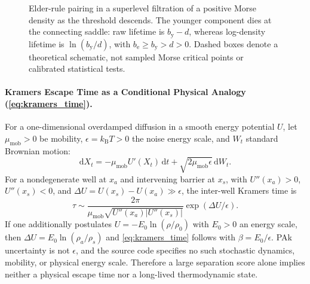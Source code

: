 \begin{figure}[htbp]
  \centering
  \caption{Elder-rule pairing in a superlevel filtration of a positive
    Morse density as the threshold descends. The younger component dies
    at the connecting saddle: raw lifetime is $b_{\mathrm y}-d$, whereas
    log-density lifetime is $\ln(b_{\mathrm y}/d)$, with $b_{\mathrm e}
    \ge b_{\mathrm y}>d>0$. Dashed boxes denote a theoretical schematic,
  not sampled Morse critical points or calibrated statistical tests.}
  \label{fig:supp_persistence_pairing}
\end{figure}

\paragraph{Kramers Escape Time as a Conditional Physical Analogy
(\cref{eq:kramers_time}).}
For a one-dimensional overdamped diffusion in a smooth energy potential
$U$, let $\mu_{\mathrm{mob}}>0$ be mobility, $\epsilon=k_{\mathrm B}T>0$
the noise energy scale, and $W_t$ standard Brownian motion:
\begin{equation}
  \mathrm{d}X_t=-\mu_{\mathrm{mob}}U'(X_t)\,\mathrm{d}t
  +\sqrt{2\mu_{\mathrm{mob}}\epsilon}\,\mathrm{d}W_t.
\end{equation}
For a nondegenerate well at $x_a$ and intervening barrier at $x_s$,
with $U''(x_a)>0$, $U''(x_s)<0$, and
$\Delta U=U(x_s)-U(x_a)\gg\epsilon$, the inter-well Kramers time is
\begin{equation}
  \tau\sim\frac{2\pi}{\mu_{\mathrm{mob}}
  \sqrt{U''(x_a)|U''(x_s)|}}\exp(\Delta U/\epsilon).
\end{equation}
If one additionally postulates $U=-E_0\ln(\rho/\rho_0)$ with
$E_0>0$ an energy scale, then $\Delta U=E_0\ln(\rho_a/\rho_s)$
and \cref{eq:kramers_time} follows with $\beta=E_0/\epsilon$.
PAk uncertainty is not $\epsilon$, and the source code specifies no
such stochastic dynamics, mobility, or physical energy scale.
Therefore a large separation score alone implies neither a physical
escape time nor a long-lived thermodynamic state.
